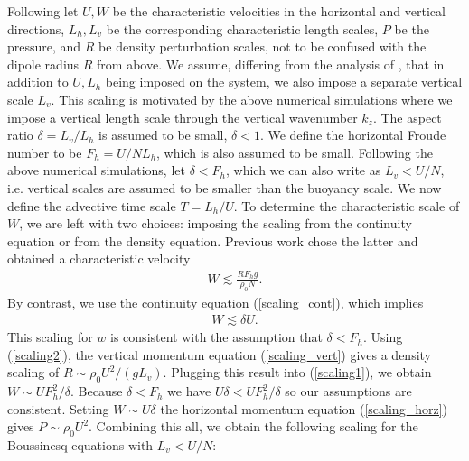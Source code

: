 Following \cite{bc2001} let $U,W$ be the characteristic velocities in the horizontal and vertical directions, $L_{h},L_{v}$ be the corresponding characteristic length scales, $P$ be the pressure, and $R$ be density perturbation scales, not to be confused with the dipole radius $R$ from above. We assume, differing from the analysis of \cite{lilly1983,bc2001}, that in addition to $U,L_{h}$ being imposed on the system, we also impose a separate vertical scale $L_{v}$. This scaling is motivated by the above numerical simulations where we impose a vertical length scale through the vertical wavenumber $k_{z}$. The aspect ratio $\delta=L_{v}/L_{h}$ is assumed to be small, $\delta<1$. We define the horizontal Froude number to be $F_{h}=U/NL_{h}$, which is also assumed to be small. Following the above numerical simulations, let $\delta < F_{h}$, which we can also write as $L_{v} < U/N$, i.e. vertical scales are assumed to be smaller than the buoyancy scale. We now define the advective time scale $T=L_{h}/U$. 
To determine the characteristic scale of $W$, we are left with two choices: imposing the scaling from the continuity equation or from the density equation. Previous work \cite{bc2001} chose the latter and obtained a characteristic velocity 
\begin{align}
W \lesssim \frac{RF_{h}g}{\rho_{0}N}\label{scaling1}. 
\end{align}
By contrast, we use the continuity equation (\ref{scaling_cont}), which implies
\begin{align}
W \lesssim \delta U\label{scaling2}.
\end{align}
This scaling for $w$ is consistent with the assumption that $\delta < F_{h}$. Using (\ref{scaling2}), the vertical momentum equation (\ref{scaling_vert}) gives a density scaling of $R\sim \rho_{0}U^{2}/(gL_{v})$. Plugging this result into (\ref{scaling1}), we obtain $W\sim UF_{h}^{2}/\delta$. Because $\delta < F_{h}$ we have $U\delta < UF_{h}^{2}/\delta$ so our assumptions are consistent. Setting $W\sim U\delta$ the horizontal momentum equation (\ref{scaling_horz}) gives $P\sim \rho_{0}U^{2}$. Combining this all, we obtain the following scaling for the Boussinesq equations with $L_{v} < U/N$:  

